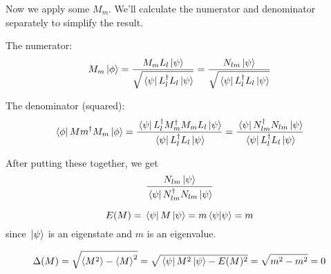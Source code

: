 Now we apply some $M_{m}$. We'll calculate the numerator and denominator separately to simplify the result. 

The numerator: 
$$M_{m} \ket*{\phi} = \frac{M_{m} L_{l} \ket*{\psi}}{\sqrt{\bra*{\psi} L_{l}^{\dagger} L_{l} \ket*{\psi}}} = \frac{N_{lm} \ket*{\psi}}{\sqrt{\bra*{\psi} L_{l}^{\dagger} L_{l} \ket*{\psi}}}$$

The denominator (squared):
$$\bra*{\phi} M{m}^{\dagger} M_{m} \ket*{\phi} = \frac{\bra*{\psi} L_{l}^{\dagger} M_{m}^{\dagger} M_{m} L_{l} \ket*{\psi}}{\bra*{\psi} L_{l}^{\dagger} L_{l} \ket*{\psi}} = \frac{\bra*{\psi} N_{lm}^{\dagger} N_{lm} \ket*{\psi}}{\bra*{\psi} L_{l}^{\dagger} L_{l} \ket*{\psi}}$$

After putting these together, we get 
$$\frac{N_{lm} \ket*{\psi}}{\bra*{\psi} N_{lm}^{\dagger} N_{lm} \ket*{\psi}}$$

\exercise 
$$E(M) = \bra*{\psi} M \ket*{\psi} = m \braket*{\psi}{\psi} = m$$
since $\ket*{\psi}$ is an eigenstate and $m$ is an eigenvalue. 

$$\Delta (M) = \sqrt{\expval{M^{2}} - \expval{M}^{2}} = \sqrt{\bra*{\psi} M^{2} \ket*{\psi} - E(M)^{2}} = \sqrt{m^{2} - m^{2}} = 0$$